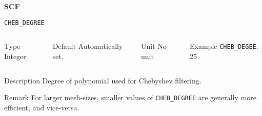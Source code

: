 \documentclass[xcolor=dvipsnames,t]{beamer}
\begin{document}
\begin{frame}[allowframebreaks,c]{} \label{SCF}

\begin{center}
\Huge \textbf{SCF}
\end{center}

\end{frame}


\begin{frame}[allowframebreaks]{\texttt{CHEB\_DEGREE}} \label{CHEB_DEGREE}
\vspace*{-12pt}
\begin{columns}
\begin{block}{Type}
Integer
\end{block}

\begin{block}{Default}
Automatically set.
\end{block}

\begin{block}{Unit}
No unit
\end{block}

\begin{block}{Example}
\texttt{CHEB\_DEGEE}: 25
\end{block}
\end{columns}

\begin{block}{Description}
Degree of polynomial used for Chebyshev filtering. 
\end{block}

\begin{block}{Remark}
For larger mesh-sizes, smaller values of \texttt{CHEB\_DEGREE} are generally more efficient, and vice-versa.
\end{block}

\end{frame}
\end{document}
